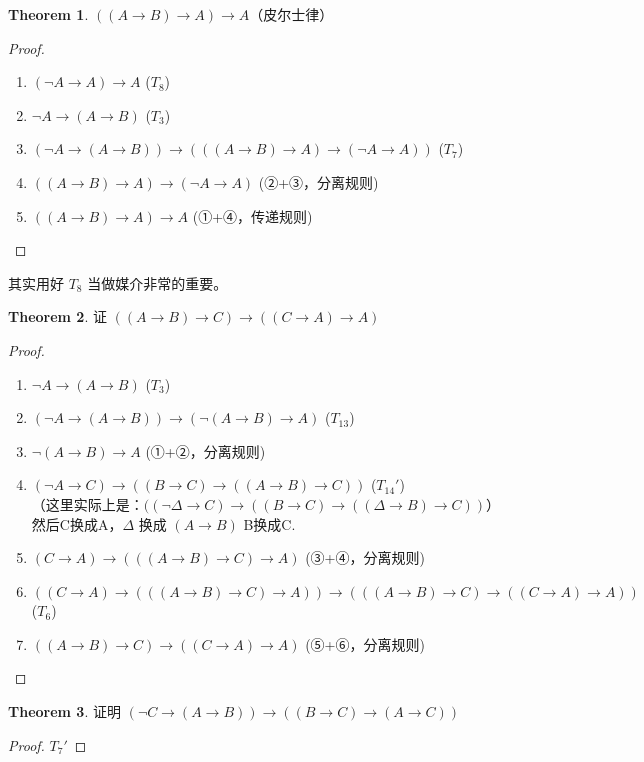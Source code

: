 \documentclass[oneside]{book}
\theoremstyle{definition}
\newtheorem{theorem}{Theorem}[section]
\begin{document}
\begin{theorem}
	\( ((A\to B)\to A)\to A \)（皮尔士律）
\end{theorem}
\begin{proof}
	\begin{enumerate}
		\item \((\neg A\to A)\to A\) \hfill (\(T_8\))
		\item \(\neg A\to (A\to B)\) \hfill (\(T_3\))
		\item \((\neg A\to (A\to B))\to (((A\to B)\to A)\to (\neg A\to A))\) \hfill (\(T_7\))
		\item \(((A\to B)\to A)\to (\neg A\to A)\) \hfill (②+③，分离规则)
		\item \(((A\to B)\to A)\to A\) \hfill (①+④，传递规则)
	\end{enumerate}
\end{proof}
其实用好 \(T_8\) 当做媒介非常的重要。
\begin{theorem}
	证 \( ((A\to B)\to C)\to ((C\to A)\to A) \)
\end{theorem}
\begin{proof}
	\begin{enumerate}
		\item \(\neg A\to (A\to B)\) \hfill (\(T_3\))
		\item \((\neg A\to (A\to B))\to (\neg(A\to B)\to A)\) \hfill (\(T_{13}\))
		\item \(\neg(A\to B)\to A\) \hfill (①+②，分离规则)
		\item \((\neg A\to C)\to ((B\to C)\to ((A\to B)\to C))\) \hfill (\(T_{14}'\))\\
		（这里实际上是：\(((\neg \Delta\to C)\to ((B\to C)\to ((\Delta\to B)\to C))\)）然后C换成A，\(\Delta\) 换成 \((A\to B)\) B换成C.
		\item \((C\to A)\to (((A\to B)\to C)\to A)\) \hfill (③+④，分离规则)
		\item \(((C\to A)\to (((A\to B)\to C)\to A)) \to (((A\to B)\to C)\to ((C\to A)\to A))\) \hfill (\(T_6\))
		\item \(((A\to B)\to C)\to ((C\to A)\to A)\) \hfill (⑤+⑥，分离规则)
	\end{enumerate}
\end{proof}

\begin{theorem}
	证明 \( (\neg C\to (A\to B))\to ((B\to C)\to (A\to C)) \)
\end{theorem}
\begin{proof}
\(T_7'\)
\end{proof}
\end{document}
